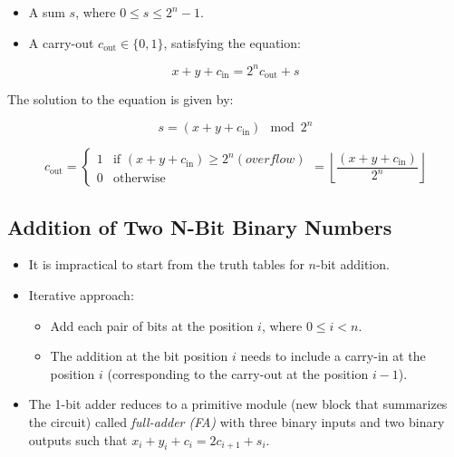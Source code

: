 \documentclass[12pt,openany]{book}
\begin{document}
			      	\begin{itemize}
			      		\item[] A sum $s$, where $0 \leq s \leq 2^n - 1$.
			      		\item[] A carry-out $c_{\text{out}} \in \{0, 1\}$, satisfying the equation:
			      	\end{itemize}
			      	
			      	\begin{equation}
			      		x + y + c_{\text{in}} = 2^n c_{\text{out}} + s
			      	\end{equation}
			      	
			      	The solution to the equation is given by:
			      	
			      	\begin{equation}
			      		s = (x + y + c_{\text{in}}) \mod 2^n
			      	\end{equation}
			      	
			      	\begin{equation}
			      		c_{\text{out}} = 
			      		\begin{cases} 
			      			1 & \text{if } (x + y + c_{\text{in}}) \geq 2^n (overflow) \\
			      			0 & \text{otherwise}                                       
			      		\end{cases}
			      		= \left\lfloor \frac{(x + y + c_{\text{in}})}{2^n} \right\rfloor
			      	\end{equation}
			      	\subsection{Addition of Two N-Bit Binary Numbers}
			      	
			      	\begin{itemize}
			      		\item[] It is impractical to start from the truth tables for \( n \)-bit addition.
			      		\item[] Iterative approach:
			      		      \begin{itemize}
			      		      	\item[] Add each pair of bits at the position \( i \), where \( 0 \leq i < n \).
			      		      	\item[] The addition at the bit position \( i \) needs to include a carry-in at the position \( i \) (corresponding to the carry-out at the position \( i - 1 \)).
			      		      \end{itemize}
			      		\item[] The 1-bit adder reduces to a primitive module (new block that summarizes the circuit) called \textit{full-adder (FA)} with three binary inputs and two binary outputs such that \newline \( x_i + y_i + c_i = 2c_{i+1} + s_i \).
			      	\end{itemize}
			      	\newpage
\end{document}
